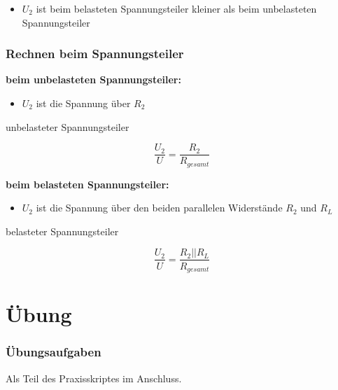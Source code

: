 \begin{frame}
\begin{columns}
\begin{figure}
    \end{figure}
  \end{columns}
  \begin{itemize}
    \item $U_2$ ist beim belasteten Spannungsteiler kleiner als beim unbelasteten Spannungsteiler
  \end{itemize}
\end{frame}

\begin{frame}
  \frametitle{Rechnen beim Spannungsteiler}
  \textbf{beim unbelasteten Spannungsteiler:}
  \begin{itemize}
    \item $U_2$ ist die Spannung über $R_2$
  \end{itemize}
  \begin{block}{unbelasteter Spannungsteiler}
    \begin{center}
      $$\frac{U_2}{U} = \frac{R_2}{R_{gesamt}}$$
    \end{center}
  \end{block}

  \textbf{beim belasteten Spannungsteiler:}
  \begin{itemize}
    \item $U_2$ ist die Spannung über den beiden parallelen Widerstände $R_2$ und $R_L$
  \end{itemize}
  \begin{block}{belasteter Spannungsteiler}
    \begin{center}
      $$\frac{U_2}{U} = \frac{R_{2}||R_{L}}{R_{gesamt}}$$
    \end{center}
  \end{block}
\end{frame}

\section{Übung}

\begin{frame}
  \frametitle{Übungsaufgaben}

  Als Teil des Praxisskriptes im Anschluss.

\end{frame}

